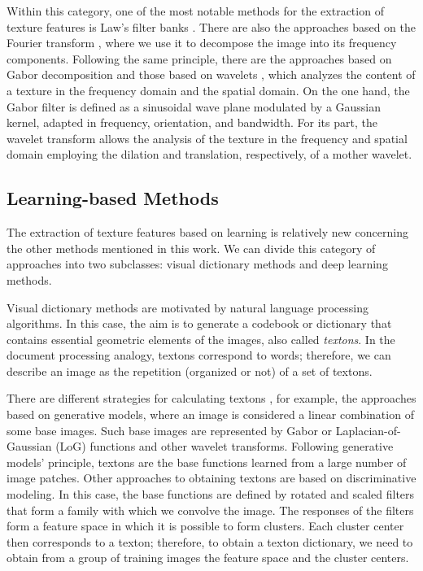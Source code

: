 Within this category, one of the most notable methods for the extraction of texture features is Law's filter banks \citep{Laws:IUW:1979, Laws:IPMG:1980, Laws:Report:1980}. There are also the approaches based on the Fourier transform \citep{Ursani.Kpalma.ea:ICMV:2007}, where we use it to decompose the image into its frequency components. Following the same principle, there are the approaches based on Gabor decomposition \citep{Gabor:JIEE:1946} and those based on wavelets  \citep{Arivazhagan.Ganesan:PR:2003}, which analyzes the content of a texture in the frequency domain and the spatial domain. On the one hand, the Gabor filter is defined as a sinusoidal wave plane modulated by a Gaussian kernel, adapted in frequency, orientation, and bandwidth. For its part, the wavelet transform allows the analysis of the texture in the frequency and spatial domain employing the dilation and translation, respectively, of a mother wavelet.

\subsection{Learning-based Methods}
The extraction of texture features based on learning is relatively new concerning the other methods mentioned in this work. We can divide this category of approaches into two subclasses: visual dictionary methods and deep learning methods.

Visual dictionary methods are motivated by natural language processing algorithms. In this case, the aim is to generate a codebook or dictionary that contains essential geometric elements of the images, also called \textit{textons}. In the document processing analogy, textons correspond to words; therefore, we can describe an image as the repetition (organized or not) of a set of textons.

There are different strategies for calculating textons \citep{Zhu.Guo.ea:IJCV:2005}, for example, the approaches based on generative models, where an image is considered a linear combination of some base images. Such base images are represented by Gabor or Laplacian-of-Gaussian (LoG) functions and other wavelet transforms. Following generative models' principle, textons are the base functions learned from a large number of image patches. 
Other approaches to obtaining textons are based on discriminative modeling. In this case, the base functions are defined by rotated and scaled filters that form a family with which we convolve the image. The responses of the filters form a feature space in which it is possible to form clusters. Each cluster center then corresponds to a texton; therefore, to obtain a texton dictionary, we need to obtain from a group of training images the feature space and the cluster centers.

